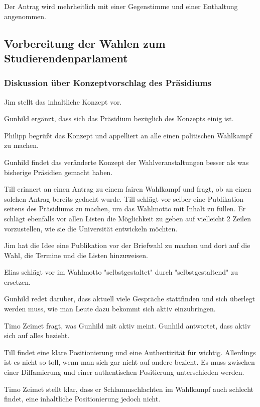 \documentclass[ngerman,headheight=70pt]{scrartcl}
\begin{document}
    Der Antrag wird mehrheitlich mit einer Gegenstimme und einer Enthaltung angenommen.

    \subsection{Vorbereitung der Wahlen zum Studierendenparlament}

    \subsubsection{Diskussion über Konzeptvorschlag des Präsidiums}

    Jim stellt das inhaltliche Konzept vor.

    Gunhild ergänzt, dass sich das Präsidium bezüglich des Konzepts einig ist.

    Philipp begrüßt das Konzept und appelliert an alle einen politischen Wahlkampf
    zu machen.

    Gunhild findet das veränderte Konzept der Wahlveranstaltungen besser als was
    bisherige Präsidien gemacht haben.

    Till erinnert an einen Antrag zu einem fairen Wahlkampf und fragt, ob an einen
    solchen Antrag bereits gedacht wurde. Till schlägt vor selber eine Publikation
    seitens des Präsidiums zu machen, um das Wahlmotto mit Inhalt zu füllen. Er
    schlägt ebenfalls vor allen Listen die Möglichkeit zu geben auf vielleicht 2
    Zeilen vorzustellen, wie sie die Universität entwickeln möchten.

    Jim hat die Idee eine Publikation vor der Briefwahl zu machen und dort auf
    die Wahl, die Termine und die Listen hinzuweisen.

    Elias schlägt vor im Wahlmotto "selbstgestaltet" durch "selbstgestaltend"
    zu ersetzen.

    Gunhild redet darüber, dass aktuell viele Gespräche stattfinden und sich überlegt
    werden muss, wie man Leute dazu bekommt sich aktiv einzubringen.

    Timo Zeimet fragt, was Gunhild mit aktiv meint. Gunhild antwortet, dass aktiv
    sich auf alles bezieht.

    Till findet eine klare Positionierung und eine Authentizität für wichtig.
    Allerdings ist es nicht so toll, wenn man sich gar nicht auf andere bezieht.
    Es muss zwischen einer Diffamierung und einer authentischen Positierung
    unterschieden werden.

    Timo Zeimet stellt klar, dass er Schlammschlachten im Wahlkampf auch schlecht
    findet, eine inhaltliche Positionierung jedoch nicht.
\end{document}
